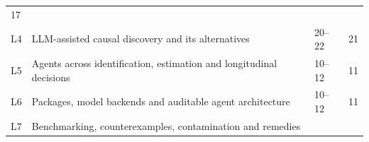 \documentclass[
  11pt,
  a4paper,
]{article}
\begin{document}
\begin{longtable}[]{@{}llll@{}}
\begin{minipage}[t]{0.22\columnwidth}
17\strut
\end{minipage}\tabularnewline
\begin{minipage}[t]{0.22\columnwidth}\raggedright
L4\strut
\end{minipage} & \begin{minipage}[t]{0.22\columnwidth}\raggedright
LLM-assisted causal discovery and its alternatives\strut
\end{minipage} & \begin{minipage}[t]{0.22\columnwidth}\raggedright
20--22\strut
\end{minipage} & \begin{minipage}[t]{0.22\columnwidth}\raggedright
21\strut
\end{minipage}\tabularnewline
\begin{minipage}[t]{0.22\columnwidth}\raggedright
L5\strut
\end{minipage} & \begin{minipage}[t]{0.22\columnwidth}\raggedright
Agents across identification, estimation and longitudinal
decisions\strut
\end{minipage} & \begin{minipage}[t]{0.22\columnwidth}\raggedright
10--12\strut
\end{minipage} & \begin{minipage}[t]{0.22\columnwidth}\raggedright
11\strut
\end{minipage}\tabularnewline
\begin{minipage}[t]{0.22\columnwidth}\raggedright
L6\strut
\end{minipage} & \begin{minipage}[t]{0.22\columnwidth}\raggedright
Packages, model backends and auditable agent architecture\strut
\end{minipage} & \begin{minipage}[t]{0.22\columnwidth}\raggedright
10--12\strut
\end{minipage} & \begin{minipage}[t]{0.22\columnwidth}\raggedright
11\strut
\end{minipage}\tabularnewline
\begin{minipage}[t]{0.22\columnwidth}\raggedright
L7\strut
\end{minipage} & \begin{minipage}[t]{0.22\columnwidth}\raggedright
Benchmarking, counterexamples, contamination and remedies\strut
\end{minipage} & \begin{minipage}[t]{0.22\columnwidth}\raggedright

\end{minipage}
\end{longtable}
\end{document}
